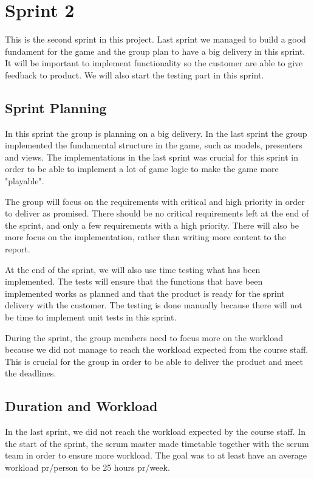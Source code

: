 
\section{Sprint 2}

	This is the second sprint in this project. Last sprint we managed to build a good
	fundament for the game and the group plan to have a big delivery in this sprint.
	It will be important to implement functionality so the customer are able to 
	give feedback to product. We will also start the testing part in this sprint.

\subsection{Sprint Planning}
	In this sprint the group is planning on a big delivery. In the last sprint the group
	implemented the fundamental structure in the game, such as models, presenters and views. 
	The implementations in the last sprint was crucial for this sprint in order to 
	be able to implement a lot of game logic to make the game more "playable".

	The group will focus on the requirements with critical and high priority in order
	to deliver as promised. There should be no critical requirements left at the end of 
	the sprint, and only a few requirements with a high priority. There will also be more 
	focus on the implementation, rather than writing more content to the report.

	At the end of the sprint, we will also use time testing what has been implemented.
	The tests will ensure that the functions that have been implemented works as planned 
	and that the product is ready for the sprint delivery with the customer. The testing is 
	done manually because there will not be time to implement unit tests in this sprint.

	During the sprint, the group members need to focus more on the workload because we did
	not manage to reach the workload expected from the course staff. This is crucial
	for the group in order to be able to deliver the product and meet the deadlines.

	\clearpage

\subsection{Duration and Workload}
	In the last sprint, we did not reach the workload expected by the course staff.
	In the start of the sprint, the scrum master made timetable together with the
	scrum team in order to ensure more workload. The goal was to at least have an
	average workload pr/person to be 25 hours pr/week. 

